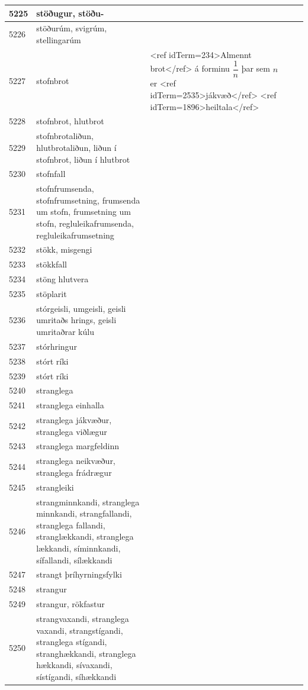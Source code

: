 \begin{longtable}{p{}|p{}|p{}|p{}|p{}}
\hline
5225 & stöðugur, stöðu- &  &  &  \\
\hline
5226 & stöðurúm, svigrúm, stellingarúm &  &  &  \\
\hline
5227 & stofnbrot & <ref idTerm=234>Almennt brot</ref> á forminu $\dfrac1n$ þar sem $n$ er <ref idTerm=2535>jákvæð</ref> <ref idTerm=1896>heiltala</ref> &  &  \\
\hline
5228 & stofnbrot, hlutbrot &  &  &  \\
\hline
5229 & stofnbrotaliðun, hlutbrotaliðun, liðun í stofnbrot, liðun í hlutbrot &  &  &  \\
\hline
5230 & stofnfall &  &  &  \\
\hline
5231 & stofnfrumsenda, stofnfrumsetning, frumsenda um stofn, frumsetning um stofn, regluleikafrumsenda, regluleikafrumsetning &  &  &  \\
\hline
5232 & stökk, misgengi &  &  &  \\
\hline
5233 & stökkfall &  &  &  \\
\hline
5234 & stöng hlutvera &  &  &  \\
\hline
5235 & stöplarit &  &  &  \\
\hline
5236 & stórgeisli, umgeisli, geisli umritaðs hrings, geisli umritaðrar kúlu &  &  &  \\
\hline
5237 & stórhringur &  &  &  \\
\hline
5238 & stórt ríki &  &  &  \\
\hline
5239 & stórt ríki &  &  &  \\
\hline
5240 & stranglega &  &  &  \\
\hline
5241 & stranglega einhalla &  &  &  \\
\hline
5242 & stranglega jákvæður, stranglega viðlægur &  &  &  \\
\hline
5243 & stranglega margfeldinn &  &  &  \\
\hline
5244 & stranglega neikvæður, stranglega frádrægur &  &  &  \\
\hline
5245 & strangleiki &  &  &  \\
\hline
5246 & strangminnkandi, stranglega minnkandi, strangfallandi, stranglega fallandi, stranglækkandi, stranglega lækkandi, síminnkandi, sífallandi, sílækkandi &  &  &  \\
\hline
5247 & strangt þríhyrningsfylki &  &  &  \\
\hline
5248 & strangur &  &  &  \\
\hline
5249 & strangur, rökfastur &  &  &  \\
\hline
5250 & strangvaxandi, stranglega vaxandi, strangstígandi, stranglega stígandi, stranghækkandi, stranglega hækkandi, sívaxandi, sístígandi, síhækkandi &  &  &  \\

\end{longtable}
